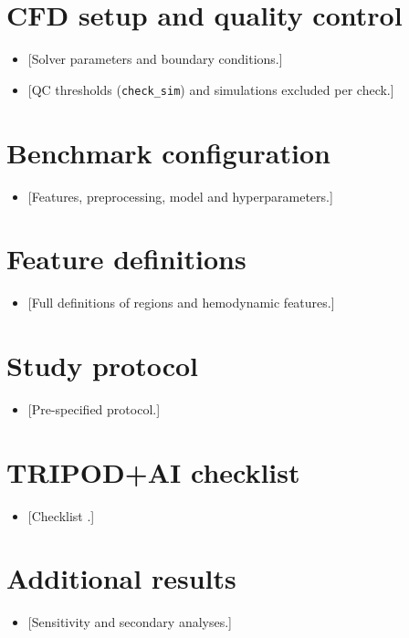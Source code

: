 \chapter{CFD setup and quality control}
\label{app:cfd}
\begin{itemize}
    \item {[}Solver parameters and boundary conditions.]
    \item {[}QC thresholds (\texttt{check\_sim}) and simulations excluded per check.]
\end{itemize}

\chapter{Benchmark configuration}
\label{app:benchmark}
\begin{itemize}
    \item {[}Features, preprocessing, model and hyperparameters.]
\end{itemize}


\chapter{Feature definitions}
\label{app:features}
\begin{itemize}
    \item {[}Full definitions of regions and hemodynamic features.]
\end{itemize}

\chapter{Study protocol}
\label{app:protocol}
\begin{itemize}
    \item {[}Pre-specified protocol.]
\end{itemize}

\chapter{TRIPOD+AI checklist}
\label{app:tripod}
\begin{itemize}
    \item {[}Checklist \cite{collins_tripodai_2024}.]
\end{itemize}

\chapter{Additional results}
\label{app:results}
\begin{itemize}
    \item {[}Sensitivity and secondary analyses.]
\end{itemize}
